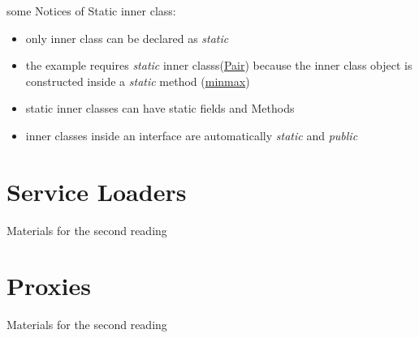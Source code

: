 \documentclass[12pt]{article}
\begin{document}
some Notices of Static inner class:
\begin{itemize}
    \item only inner class can be declared as \emph{static}
    \item the example requires \emph{static} inner classs(\underline{Pair}) because the inner class object is constructed inside a 
    \emph{static} method (\underline{minmax})
    \item static inner classes can have static fields and Methods
    \item inner classes inside an interface are automatically \emph{static} and \emph{public}
\end{itemize} 

\section{Service Loaders}
Materials for the second reading

\section{Proxies}
Materials for the second reading
\end{document}
